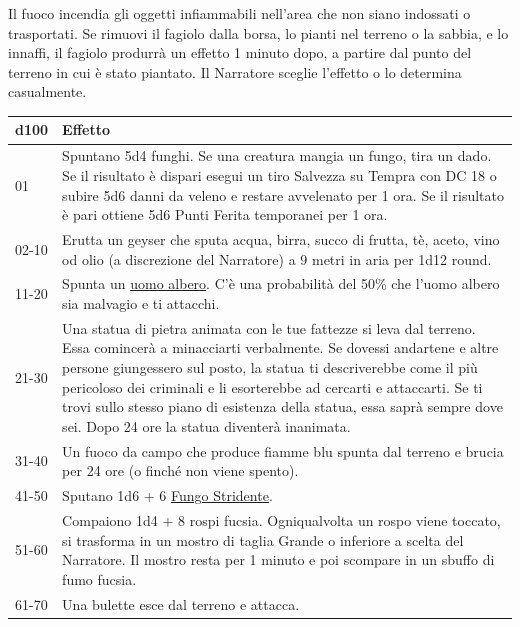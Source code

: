 \begin{multicols}{2}
Il fuoco incendia gli oggetti infiammabili nell'area che non siano indossati o trasportati. Se rimuovi il fagiolo dalla borsa, lo pianti nel terreno o la sabbia, e lo innaffi, il fagiolo produrrà un effetto 1 minuto dopo, a partire dal punto del terreno in cui è stato piantato. Il Narratore sceglie l'effetto o lo determina casualmente.

\medskip

\noindent\begin{tabularx}{\linewidth}{lX}
	\toprule
\rowcolor{gray!20}\textbf{d100} & \textbf{Effetto}\\
\toprule
01 &Spuntano 5d4 funghi. Se una creatura mangia un fungo, tira un dado. Se il risultato è dispari esegui un tiro Salvezza su Tempra con DC 18 o subire 5d6 danni da veleno e restare avvelenato per 1 ora. Se il risultato è pari ottiene 5d6 Punti Ferita temporanei per 1 ora.\\
\rowcolor{gray!20}02-10 &Erutta un geyser che sputa acqua, birra, succo di frutta, tè, aceto, vino od olio (a discrezione del Narratore) a 9 metri in aria per 1d12 round.\\
11-20 &Spunta un \hyperlink{Uomo Albero (Arborom)}{uomo albero}. C'è una probabilità del 50\% che l'uomo albero sia malvagio e ti attacchi.\\
\rowcolor{gray!20}21-30 &Una statua di pietra animata con le tue fattezze si leva dal terreno. Essa comincerà a minacciarti verbalmente. Se dovessi andartene e altre persone giungessero sul posto, la statua ti descriverebbe come il più pericoloso dei criminali e li esorterebbe ad cercarti e attaccarti. Se ti trovi sullo stesso piano di esistenza della statua, essa saprà sempre dove sei. Dopo 24 ore la statua diventerà inanimata.\\
31-40 &Un fuoco da campo che produce fiamme blu spunta dal terreno e brucia per 24 ore (o finché non viene spento).\\
\rowcolor{gray!20}41-50 &Sputano 1d6 + 6 \hyperlink{Fungo Stridente}{Fungo Stridente}.\\
51-60 &Compaiono 1d4 + 8 rospi fucsia. Ogniqualvolta un rospo viene toccato, si trasforma in un mostro di taglia Grande o inferiore a scelta del Narratore. Il mostro resta per 1 minuto e poi scompare in un sbuffo di fumo fucsia. \\
\rowcolor{gray!20}61-70 & Una bulette esce dal terreno e attacca.\\
\end{tabularx}
\noindent\begin{tabularx}{\linewidth}{lX}

\end{tabularx}
\end{multicols}
